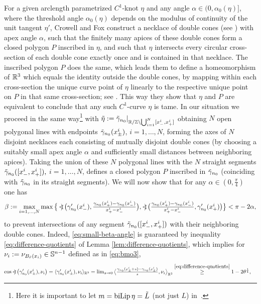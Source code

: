 For a given arclength parametrized $C^1$-knot $\eta$ and any angle
$\alpha\in (0,\alpha_0(\eta)]$, where the threshold angle $\alpha_0(\eta)$
depends on the modulus of continuity of the unit tangent $\eta'$,
Crowell and Fox construct a necklace of double cones (see
\cite[Figure 62]{crowell-fox_1977}) with apex angle $\alpha$,
such that the finitely many apices of these double cones form a closed
polygon $P$ inscribed in $\eta$, and such that $\eta$ intersects every
circular cross-section of each double cone exactly once
and is contained in that necklace. The inscribed
polygon $P$ does the same, which leads them to define a homeomorphism
of $\R^3$ which equals the identity outside the double cones, by
mapping within each cross-section the unique curve point of $\eta$ linearly
to the respective unique point on $P$ in that same cross-section;
see \cite[Figure 64]{crowell-fox_1977}. This way they show that $\eta$
and $P$ are equivalent to conclude that any such $C^1$-curve $\eta$
is tame. In our situation we proceed in the same way\footnote{Here it is important to let 
$m=\bilip\eta=\tilde L$ (not just $L$) 
in~\cite[Eq.~(6), p.~149]{crowell-fox_1977}.} 
with $\tilde{\eta}:=
\tilde{\g}_{n_0}|_{\R/\Z\setminus\bigcup_{i=1}^N [x_-^i,x_+^i]}$
obtaining $N$ open polygonal lines with endpoints $\tilde{\g}_{n_0}(x_\pm^i)$,
$i=1,\ldots,N$, forming the axes of $N$ disjoint necklaces each consisting
of mutually disjoint double cones (by choosing a suitably small 
apex angle $\alpha$ and sufficiently small distances between
neighboring apices). Taking the union of these $N$ polygonal lines with the
$N$ straight segments $\tilde{\g}_{n_0}([x_-^i,x_+^i]), $ $i=1,\ldots,N$,
defines a closed polygon $P$ inscribed in $\tilde{\g}_{n_0}$ (coinciding
with $\tilde{\g}_{n_0}$ in its straight segments). 
We will now show that for any
 $\alpha\in (0,\frac{\pi}4)$ one has
\begin{equation}\label{eq:small-beta-angle}
\beta:=\max_{i=1,\ldots,N}\textstyle
\max\big\{\ANG\big(\g_{n_0}'(x_-^i),\frac{\g_{n_0}(x_+^i)-\g_{n_0}(x_-^i)}{
x_+^i-x_-^i}\big),
\ANG\big(\frac{\g_{n_0}(x_+^i)-\g_{n_0}(x_-^i)}{
x_+^i-x_-^i},\g_{n_0}'(x_+^i)\big)
\big\} < \pi -2\alpha,
\end{equation}
to prevent intersections of any segment $\tilde{\g}_{n_0}([x_-^i,x_+^i])$
with their neighboring double cones. 
Indeed, \eqref{eq:small-beta-angle} is guaranteed by inequality
\eqref{eq:difference-quotients} of Lemma \ref{lem:difference-quotients},
which implies for $\nu_i:=\nu_{B_{\bar{r}}(x_i)}\in\S^{n-1}$ defined
as in \eqref{eq:bmo3},
\begin{align*}
\cos\ANG\big(\g_{n_0}'(x_\pm^i),\nu_i\big)& =
\textstyle
\langle\g_{n_0}'(x_\pm^i),\nu_i
\rangle_{\R^3}=\lim_{s\to 0}\big\langle 
\frac{\g_{n_0}(x_\pm^i+s)-\g_{n_0}(x_\pm^i)}{s},\nu_i\big\rangle_{\R^3}
\overset{\eqref{eq:difference-quotients}}{\ge}
1-2\theta^\frac14,
\end{align*}
